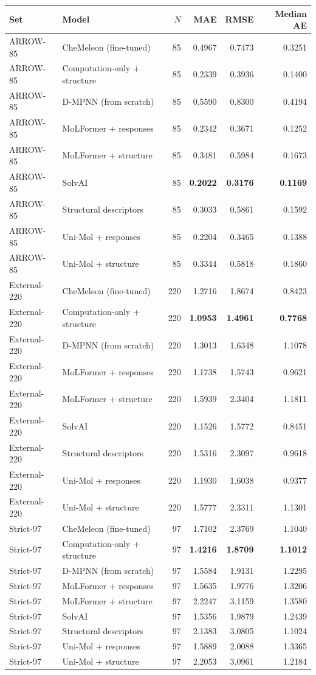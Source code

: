 \begin{longtable}{@{}llrrrr@{}}
\toprule
Set & Model & $N$ & MAE & RMSE & Median AE \\
\midrule
\endhead
ARROW-85 & CheMeleon (fine-tuned) & 85 & 0.4967 & 0.7473 & 0.3251 \\
ARROW-85 & Computation-only + structure & 85 & 0.2339 & 0.3936 & 0.1400 \\
ARROW-85 & D-MPNN (from scratch) & 85 & 0.5590 & 0.8300 & 0.4194 \\
ARROW-85 & MoLFormer + responses & 85 & 0.2342 & 0.3671 & 0.1252 \\
ARROW-85 & MoLFormer + structure & 85 & 0.3481 & 0.5984 & 0.1673 \\
ARROW-85 & SolvAI & 85 & \textbf{0.2022} & \textbf{0.3176} & \textbf{0.1169} \\
ARROW-85 & Structural descriptors & 85 & 0.3033 & 0.5861 & 0.1592 \\
ARROW-85 & Uni-Mol + responses & 85 & 0.2204 & 0.3465 & 0.1388 \\
ARROW-85 & Uni-Mol + structure & 85 & 0.3344 & 0.5818 & 0.1860 \\
External-220 & CheMeleon (fine-tuned) & 220 & 1.2716 & 1.8674 & 0.8423 \\
External-220 & Computation-only + structure & 220 & \textbf{1.0953} & \textbf{1.4961} & \textbf{0.7768} \\
External-220 & D-MPNN (from scratch) & 220 & 1.3013 & 1.6348 & 1.1078 \\
External-220 & MoLFormer + responses & 220 & 1.1738 & 1.5743 & 0.9621 \\
External-220 & MoLFormer + structure & 220 & 1.5939 & 2.3404 & 1.1811 \\
External-220 & SolvAI & 220 & 1.1526 & 1.5772 & 0.8451 \\
External-220 & Structural descriptors & 220 & 1.5316 & 2.3097 & 0.9618 \\
External-220 & Uni-Mol + responses & 220 & 1.1930 & 1.6038 & 0.9377 \\
External-220 & Uni-Mol + structure & 220 & 1.5777 & 2.3311 & 1.1301 \\
Strict-97 & CheMeleon (fine-tuned) & 97 & 1.7102 & 2.3769 & 1.1040 \\
Strict-97 & Computation-only + structure & 97 & \textbf{1.4216} & \textbf{1.8709} & \textbf{1.1012} \\
Strict-97 & D-MPNN (from scratch) & 97 & 1.5584 & 1.9131 & 1.2295 \\
Strict-97 & MoLFormer + responses & 97 & 1.5635 & 1.9776 & 1.3206 \\
Strict-97 & MoLFormer + structure & 97 & 2.2247 & 3.1159 & 1.3580 \\
Strict-97 & SolvAI & 97 & 1.5356 & 1.9879 & 1.2439 \\
Strict-97 & Structural descriptors & 97 & 2.1383 & 3.0805 & 1.1024 \\
Strict-97 & Uni-Mol + responses & 97 & 1.5889 & 2.0088 & 1.3365 \\
Strict-97 & Uni-Mol + structure & 97 & 2.2053 & 3.0961 & 1.2184 \\
\bottomrule\end{longtable}
